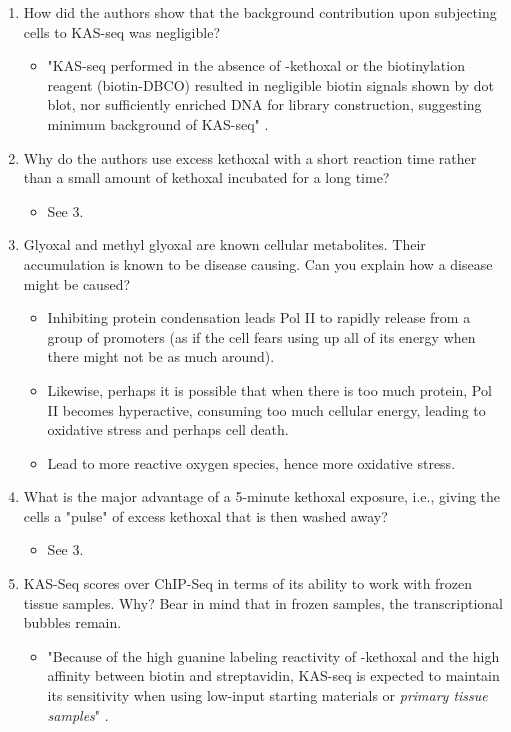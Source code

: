 \documentclass[../notes.tex]{subfiles}
\begin{document}
\begin{enumerate}
\begin{itemize}
    \end{itemize}
    \item How did the authors show that the background contribution upon subjecting cells to KAS-seq was negligible?
    \begin{itemize}
        \item "KAS-seq performed in the absence of -kethoxal or the biotinylation reagent (biotin-DBCO) resulted in negligible biotin signals shown by dot blot, nor sufficiently enriched DNA for library construction, suggesting minimum background of KAS-seq" \parencite[516]{bib:QuizReading}.
    \end{itemize}
    \item Why do the authors use excess kethoxal with a short reaction time rather than a small amount of kethoxal incubated for a long time?
    \begin{itemize}
        \item See 3.
    \end{itemize}
    \item Glyoxal and methyl glyoxal are known cellular metabolites. Their accumulation is known to be disease causing. Can you explain how a disease might be caused?
    \begin{itemize}
        \item Inhibiting protein condensation leads Pol II to rapidly release from a group of promoters (as if the cell fears using up all of its energy when there might not be as much around).
        \item Likewise, perhaps it is possible that when there is too much protein, Pol II becomes hyperactive, consuming too much cellular energy, leading to oxidative stress and perhaps cell death.
        \item Lead to more reactive oxygen species, hence more oxidative stress.
    \end{itemize}
    \item What is the major advantage of a 5-minute kethoxal exposure, i.e., giving the cells a "pulse" of excess kethoxal that is then washed away?
    \begin{itemize}
        \item See 3.
    \end{itemize}
    \item KAS-Seq scores over ChIP-Seq in terms of its ability to work with frozen tissue samples. Why? Bear in mind that in frozen samples, the transcriptional bubbles remain.
    \begin{itemize}
        \item "Because of the high guanine labeling reactivity of -kethoxal and the high affinity between biotin and streptavidin, KAS-seq is expected to maintain its sensitivity when using low-input starting materials or \emph{primary tissue samples}" \parencite[516]{bib:QuizReading}.

\end{itemize}
\end{enumerate}
\end{document}
